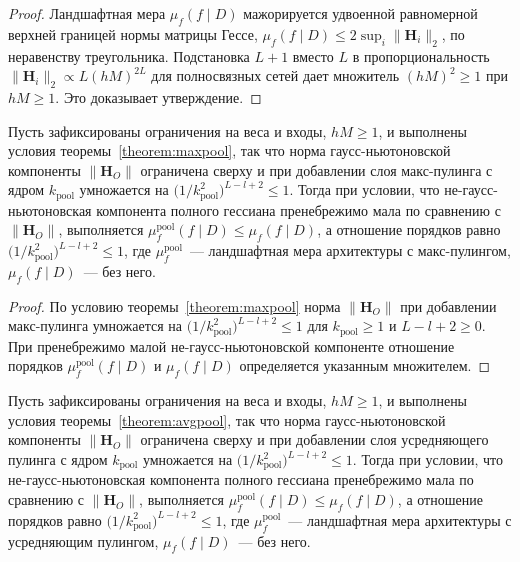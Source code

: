 \begin{proof}
Ландшафтная мера $\mu_f(f\mid D)$ мажорируется удвоенной равномерной верхней границей нормы матрицы Гессе, $\mu_f(f\mid D)\le 2\sup_i\|\mathbf{H}_i\|_2$, по неравенству треугольника.
Подстановка $L+1$ вместо $L$ в пропорциональность $\|\mathbf{H}_i\|_2\propto L(hM)^{2L}$ для полносвязных сетей дает множитель $(hM)^2\ge 1$ при $hM\ge 1$.
Это доказывает утверждение. \end{proof}

\begin{corollary}\label{ch2:cor:pooling-monotone-max}
Пусть зафиксированы ограничения на веса и входы, $hM\ge 1$, и выполнены условия теоремы~\ref{theorem:maxpool}, так что норма гаусс-ньютоновской компоненты $\|\mathbf{H}_O\|$ ограничена сверху и при добавлении слоя макс-пулинга с ядром $k_{\mathrm{pool}}$ умножается на $\bigl(1/k_{\mathrm{pool}}^2\bigr)^{L-l+2}\le 1$. Тогда при условии, что не-гаусс-ньютоновская компонента полного гессиана пренебрежимо мала по сравнению с $\|\mathbf{H}_O\|$, выполняется $\mu_f^{\mathrm{pool}}(f\mid D)\le\mu_f(f\mid D)$, а отношение порядков равно $\bigl(1/k_{\mathrm{pool}}^2\bigr)^{L-l+2}\le 1$, где $\mu_f^{\mathrm{pool}}$~--- ландшафтная мера архитектуры с макс-пулингом, $\mu_f(f\mid D)$~--- без него.
\end{corollary}

\begin{proof}
По условию теоремы~\ref{theorem:maxpool} норма $\|\mathbf{H}_O\|$ при добавлении макс-пулинга умножается на $\bigl(1/k_{\mathrm{pool}}^2\bigr)^{L-l+2}\le 1$ для $k_{\mathrm{pool}}\ge 1$ и $L-l+2\ge 0$.
При пренебрежимо малой не-гаусс-ньютоновской компоненте отношение порядков $\mu_f^{\mathrm{pool}}(f\mid D)$ и $\mu_f(f\mid D)$ определяется указанным множителем. \end{proof}

\begin{corollary}\label{ch2:cor:pooling-monotone-avg}
Пусть зафиксированы ограничения на веса и входы, $hM\ge 1$, и выполнены условия теоремы~\ref{theorem:avgpool}, так что норма гаусс-ньютоновской компоненты $\|\mathbf{H}_O\|$ ограничена сверху и при добавлении слоя усредняющего пулинга с ядром $k_{\mathrm{pool}}$ умножается на $\bigl(1/k_{\mathrm{pool}}^2\bigr)^{L-l+2}\le 1$. Тогда при условии, что не-гаусс-ньютоновская компонента полного гессиана пренебрежимо мала по сравнению с $\|\mathbf{H}_O\|$, выполняется $\mu_f^{\mathrm{pool}}(f\mid D)\le\mu_f(f\mid D)$, а отношение порядков равно $\bigl(1/k_{\mathrm{pool}}^2\bigr)^{L-l+2}\le 1$, где $\mu_f^{\mathrm{pool}}$~--- ландшафтная мера архитектуры с усредняющим пулингом, $\mu_f(f\mid D)$~--- без него.
\end{corollary}


